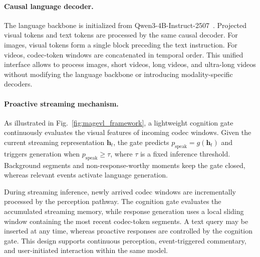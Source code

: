\paragraph{Causal language decoder.}
The language backbone is initialized from Qwen3-4B-Instruct-2507~\cite{qwen3}. Projected visual tokens and text tokens are processed by the same causal decoder. For images, visual tokens form a single block preceding the text instruction. For videos, codec-token windows are concatenated in temporal order. This unified interface allows \magevl to process images, short videos, long videos, and ultra-long videos without modifying the language backbone or introducing modality-specific decoders.

\paragraph{Proactive streaming mechanism.}
As illustrated in Fig.~\ref{fig:magevl_framework}, a lightweight cognition gate continuously evaluates the visual features of incoming codec windows. Given the current streaming representation $\mathbf{h}_t$, the gate predicts $p_{\mathrm{speak}}=g(\mathbf{h}_t)$ and triggers generation when $p_{\mathrm{speak}}\geq\tau$, where $\tau$ is a fixed inference threshold. Background segments and non-response-worthy moments keep the gate closed, whereas relevant events activate language generation.

During streaming inference, newly arrived codec windows are incrementally processed by the perception pathway. The cognition gate evaluates the accumulated streaming memory, while response generation uses a local sliding window containing the most recent codec-token segments. A text query may be inserted at any time, whereas proactive responses are controlled by the cognition gate. This design supports continuous perception, event-triggered commentary, and user-initiated interaction within the same model.


